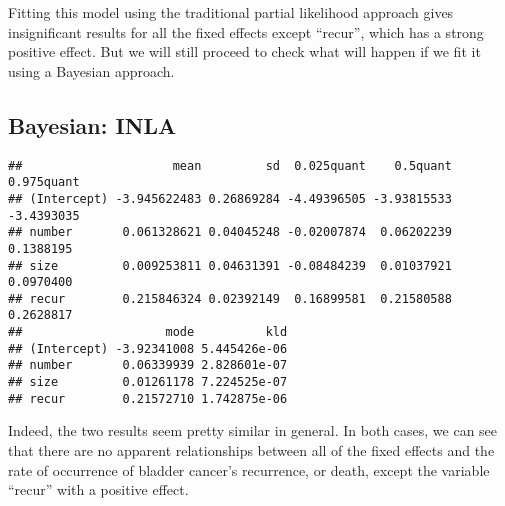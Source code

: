 \documentclass[]{article}
\newenvironment{Shaded}{\begin{snugshade}}{\end{snugshade}}
\newcommand{\DataTypeTok}[1]{\textcolor[rgb]{0.13,0.29,0.53}{#1}}
\newcommand{\DecValTok}[1]{\textcolor[rgb]{0.00,0.00,0.81}{#1}}
\newcommand{\KeywordTok}[1]{\textcolor[rgb]{0.13,0.29,0.53}{\textbf{#1}}}
\newcommand{\NormalTok}[1]{#1}
\newcommand{\OperatorTok}[1]{\textcolor[rgb]{0.81,0.36,0.00}{\textbf{#1}}}
\newcommand{\OtherTok}[1]{\textcolor[rgb]{0.56,0.35,0.01}{#1}}
\newcommand{\StringTok}[1]{\textcolor[rgb]{0.31,0.60,0.02}{#1}}
\begin{document}
Fitting this model using the traditional partial likelihood approach
gives insignificant results for all the fixed effects except ``recur'',
which has a strong positive effect. But we will still proceed to check
what will happen if we fit it using a Bayesian approach.

\hypertarget{bayesian-inla-1}{%
\subsection{Bayesian: INLA}\label{bayesian-inla-1}}

\begin{Shaded}
\end{Shaded}

\begin{verbatim}
##                     mean         sd  0.025quant    0.5quant 0.975quant
## (Intercept) -3.945622483 0.26869284 -4.49396505 -3.93815533 -3.4393035
## number       0.061328621 0.04045248 -0.02007874  0.06202239  0.1388195
## size         0.009253811 0.04631391 -0.08484239  0.01037921  0.0970400
## recur        0.215846324 0.02392149  0.16899581  0.21580588  0.2628817
##                    mode          kld
## (Intercept) -3.92341008 5.445426e-06
## number       0.06339939 2.828601e-07
## size         0.01261178 7.224525e-07
## recur        0.21572710 1.742875e-06
\end{verbatim}

Indeed, the two results seem pretty similar in general. In both cases,
we can see that there are no apparent relationships between all of the
fixed effects and the rate of occurrence of bladder cancer's recurrence,
or death, except the variable ``recur'' with a positive effect.
\end{document}
